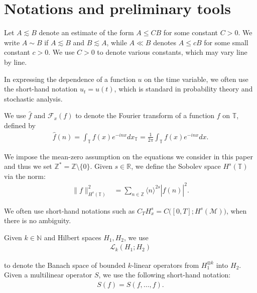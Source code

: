 \documentclass[letterpaper, 11pt,  reqno]{amsart}
\newcommand{\1}{\hspace{0.5mm}\text{I}\hspace{0.5mm}}
\newcommand{\noi}{\noindent}
\newcommand{\Z}{\mathbb{Z}}
\newcommand{\R}{\mathbb{R}}
\newcommand{\T}{\mathbb{T}}
\newcommand{\F}{\mathcal{F}}
\newcommand{\al}{\alpha}
\newcommand{\ft}{\widehat}
\newcommand{\les}{\lesssim}
\newcommand{\jb}[1]
{\langle #1 \rangle}
\newcommand{\M}{\mathcal{M}}
\newcommand{\N}{\mathbb{N}}
\newcommand{\cL}{\mathcal{L}}
\numberwithin{equation}{section}
\numberwithin{theorem}{section}
\begin{document}
\section{Notations and preliminary tools}
\label{SEC:2}


Let $A\les B$ denote an estimate of the form $A\leq CB$ for some constant $C>0$. We write $A\sim B$ if $A\les B$ and $B\les A$, while $A\ll B$ denotes $A\leq c B$ for some small constant $c> 0$. 
We use $C>0$ to denote various constants, which may vary line by line.



In expressing the dependence of a function $u$
on the time variable, we often use the short-hand notation
$u_t = u(t)$,  which is standard in probability theory and stochastic analysis.





We  use $\ft f$ and $\F_x(f)$
to denote
the  Fourier transform
of a function $f$ on $\T$, 
defined by 
\begin{align*}
\ft  f(n)=\int_{\T}f(x)e^{-i n x} d x_\T
= \frac 1 {2\pi}\int_{\T}f(x)e^{-i n x} d x.
\end{align*}

\noi
We impose the mean-zero assumption
on  the equations we consider in this paper
and thus we set  $\Z^* = \Z \setminus \{0\}$.
Given $s \in \R$, 
we define the  Sobolev space $H^{s}(\T)$ 
via the norm: 
\begin{align*}
\|  f  \|^2_{H^{s}(\T)}
& =
\sum_{n \in \Z} \jb{n}^{2s} |\ft f(n)|^2.
  \end{align*}


We often use short-hand notations such as
$C_T H^s_x  = C\big([0, T]; H^s(\M))$, 
 when there is no ambiguity.





Given $k \in \N$
and Hilbert spaces $H_1, H_2$,  
we use 
\begin{align*}
\cL_k(H_1; H_2)
\end{align*}

\noi
 to denote 
the Banach space of bounded $k$-linear operators 
from  $H_1^{\otimes k}$ into $H_2$.
Given a multilinear operator $S$, 
we use the following short-hand notation:
\begin{align}
S(f) = S(f, \dots, f).
\label{short1}
\end{align}
\end{document}
